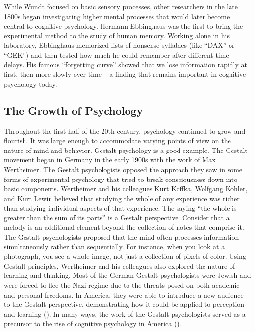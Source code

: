 \documentclass[
]{krantz}
\begin{document}
While Wundt focused on basic sensory processes, other researchers in the late 1800s began investigating higher mental processes that would later become central to cognitive psychology. Hermann Ebbinghaus was the first to bring the experimental method to the study of human memory. Working alone in his laboratory, Ebbinghaus memorized lists of nonsense syllables (like ``DAX'' or ``GEK'') and then tested how much he could remember after different time delays. His famous ``forgetting curve'' showed that we lose information rapidly at first, then more slowly over time -- a finding that remains important in cognitive psychology today.

\subsection*{The Growth of Psychology}\label{the-growth-of-psychology}


Throughout the first half of the 20th century, psychology continued to grow and flourish. It was large enough to accommodate varying points of view on the nature of mind and behavior. Gestalt psychology is a good example. The Gestalt movement began in Germany in the early 1900s with the work of Max Wertheimer. The Gestalt psychologists opposed the approach they saw in some forms of experimental psychology that tried to break consciousness down into basic components. Wertheimer and his colleagues Kurt Koffka, Wolfgang Kohler, and Kurt Lewin believed that studying the whole of any experience was richer than studying individual aspects of that experience. The saying ``the whole is greater than the sum of its parts'' is a Gestalt perspective. Consider that a melody is an additional element beyond the collection of notes that comprise it. The Gestalt psychologists proposed that the mind often processes information simultaneously rather than sequentially. For instance, when you look at a photograph, you see a whole image, not just a collection of pixels of color. Using Gestalt principles, Wertheimer and his colleagues also explored the nature of learning and thinking. Most of the German Gestalt psychologists were Jewish and were forced to flee the Nazi regime due to the threats posed on both academic and personal freedoms. In America, they were able to introduce a new audience to the Gestalt perspective, demonstrating how it could be applied to perception and learning (). In many ways, the work of the Gestalt psychologists served as a precursor to the rise of cognitive psychology in America ().
\end{document}
